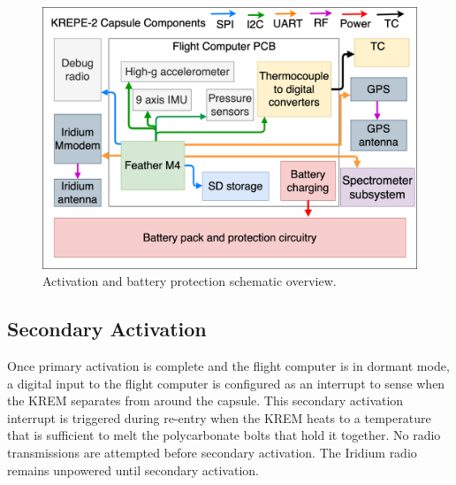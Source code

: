 \documentclass{article}
\begin{document}
\begin{figure}[H]
    \centering
    \includegraphics[width=12cm]{images/krepe2-avionics.png}
    \caption{Activation and battery protection schematic overview.}
    \label{fig:activation-circuitry}
\end{figure}







\subsection{Secondary Activation}
\label{sec:secondary-activation}
Once primary activation is complete and the flight computer is in dormant mode, a digital input to the flight computer is configured as an interrupt to sense when the KREM separates from around the capsule. This secondary activation interrupt is triggered during re-entry when the KREM heats to a temperature that is sufficient to melt the polycarbonate bolts that hold it together. No radio transmissions are attempted before secondary activation. The Iridium radio remains unpowered until secondary activation.


\end{document}
